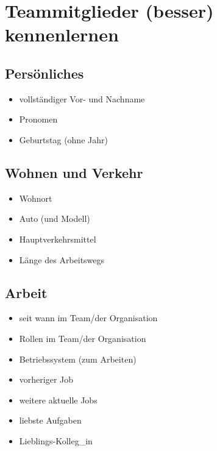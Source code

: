 \section{Teammitglieder (besser) kennenlernen}
\label{Kennenlernen}

\subsection{Persönliches}

\begin{multicols}{2}
  \begin{itemize}
    \item vollständiger Vor- und Nachname
    \item Pronomen
    \item Geburtstag (ohne Jahr)
  \end{itemize}
\end{multicols}


\subsection{Wohnen und Verkehr}

\begin{multicols}{2}
  \begin{itemize}
    \item Wohnort
    \item Auto (und Modell)
    \item Hauptverkehrsmittel
    \item Länge des Arbeitswegs
  \end{itemize}
\end{multicols}


\subsection{Arbeit}

\begin{multicols}{2}
  \begin{itemize}
    \item seit wann im Team/der Organisation
    \item Rollen im Team/der Organisation
    \item Betriebssystem (zum Arbeiten)
    \item vorheriger Job
    \item weitere aktuelle Jobs
    \item liebste Aufgaben
    \item Lieblings-Kolleg\_in
  \end{itemize}
\end{multicols}


